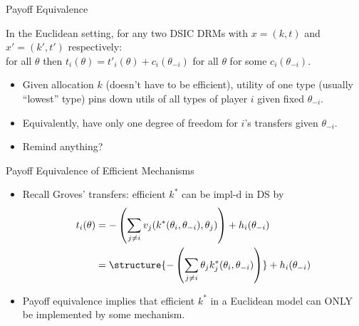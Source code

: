 \documentclass[english,10pt
,aspectratio=169
]{beamer}
\begin{document}
\begin{frame}{Payoff Equivalence}
\begin{theorem}
	In the Euclidean setting, for any two DSIC DRMs with $x = (k,t)$ and $x' = (k',t')$ respectively:
	\\ 	
	 for all $\theta$ \alert{then $t_i(\theta) = t'_i(\theta) + c_i (\theta_{-i})$} for all $\theta$ for some $c_i(\theta_{-i})$.
\end{theorem}
\pause
\begin{itemize} 
	\item Given allocation $k$ (doesn't have to be efficient), utility of one type (usually ``lowest'' type) pins down utils of all types of player $i$ given fixed $\theta_{-i}$.
	\pause
	\item Equivalently, have only one degree of freedom for $i$'s transfers given $\theta_{-i}$.
	\item Remind anything?
\end{itemize}
\end{frame}


\begin{frame}{Payoff Equivalence of Efficient Mechanisms}
\begin{itemize}
	\item Recall Groves' transfers: efficient $k^*$ can be impl-d in DS by
	\vspace{-0.5em}\begin{align*}
		t_{i}(\theta) &= -\left(\sum_{j\neq i} v_{j}(k^*(\theta_i, \theta_{-i}), \theta_{j}) \right) + h_{i}(\theta_{-i})
		\\ &= \structure{-\left(\sum_{j\neq i} \theta_j k_j^*(\theta_i, \theta_{-i}) \right)} + h_{i}(\theta_{-i})
	\end{align*}
	
	\pause
	\item Payoff equivalence implies that \alert{efficient} $k^*$ in a \alert{Euclidean} model can \alert{ONLY} be implemented by some  mechanism.
\end{itemize}
\end{frame}
\end{document}
